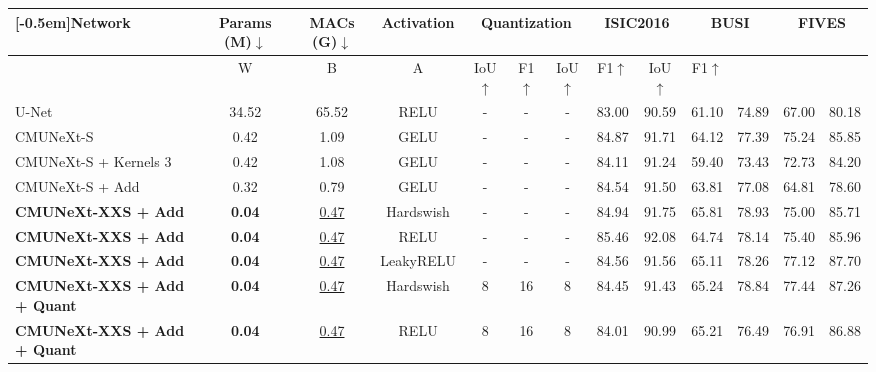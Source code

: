 \begin{tabular}{>{\centering\arraybackslash}m{3cm}ccc|ccc|cc|cc|cc}
\toprule[1.1pt]
\multirow{2}{*}[-0.5em]{\centering Network} & 
\multirow{2}{*}[-0.5em]{\centering Params (M)$\downarrow$} & 
\multirow{2}{*}[-0.5em]{\centering MACs (G)$\downarrow$} &
\multirow{2}{*}[-0.5em]{\centering Activation} &
\multicolumn{3}{c|}{Quantization} &
\multicolumn{2}{c|}{ISIC2016} & 
\multicolumn{2}{c|}{BUSI} & 
\multicolumn{2}{c}{FIVES} \\

\cmidrule{5-7} \cmidrule{8-13}
\multicolumn{4}{c|}{} & 
W & 
B & 
A & 
IoU$\uparrow$ & 
F1$\uparrow$ & 
IoU$\uparrow$ & 
F1$\uparrow$ & 
IoU$\uparrow$ & 
F1$\uparrow$ \\ 
\midrule[0.7pt]


U-Net 
& 34.52 & 65.52 & RELU
& - & - & -  
& 83.00 & 90.59     
& 61.10 & 74.89     
& 67.00 & 80.18 \\  

\midrule[0.7pt]

CMUNeXt-S
& 0.42 & 1.09 & GELU
& - & - & -
& 84.87 & 91.71 
& 64.12 & 77.39
& 75.24 & 85.85 \\

\midrule[0.7pt]

CMUNeXt-S + Kernels 3
& 0.42 & 1.08 & GELU
& - & - & -  
& 84.11 & 91.24 
& 59.40 & 73.43
& 72.73 & 84.20 \\ 

\midrule[0.7pt]

CMUNeXt-S + Add
& 0.32 & 0.79 & GELU
& - & - & -  
& 84.54 & 91.50 
& 63.81 & 77.08
& 64.81 & 78.60 \\ 

\midrule[0.7pt]

\textbf{CMUNeXt-XXS + Add}
& \textbf{0.04} & \underline{0.47} & Hardswish
& - & - & -  
& 84.94 & 91.75 
& 65.81 & 78.93
& 75.00 & 85.71 \\ 

\textbf{CMUNeXt-XXS + Add}  
& \textbf{0.04} & \underline{0.47} & RELU
& - & - & - 
& 85.46 & 92.08 
& 64.74 & 78.14 
& 75.40 & 85.96 \\ 

\textbf{CMUNeXt-XXS + Add}  
& \textbf{0.04} & \underline{0.47} & LeakyRELU
& - & - & - 
& 84.56 & 91.56 
& 65.11 & 78.26
& 77.12 & 87.70 \\ 


\midrule[0.7pt]

\textbf{CMUNeXt-XXS + Add + Quant}  
& \textbf{0.04} & \underline{0.47} & Hardswish
& 8 & 16 & 8 
& 84.45 & 91.43 
& 65.24 & 78.84 
& 77.44 & 87.26 \\ 

\textbf{CMUNeXt-XXS + Add + Quant}  
& \textbf{0.04} & \underline{0.47} & RELU
& 8 & 16 & 8
& 84.01 & 90.99 
& 65.21 & 76.49 
& 76.91 & 86.88 \\ 


\bottomrule[1.1pt]
\end{tabular}